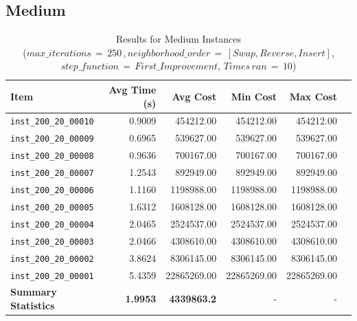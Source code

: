 \documentclass{article}
\begin{document}
\subsection*{Medium}
\begin{table}[H]
 	 \centering 
     \caption{Results for Medium Instances \\($max\_iterations \,{=}\, 250\,, neighborhood\_order \,{=}\, [Swap, Reverse, Insert]$, $step\_function \,{=}\, First\_Improvement$, $Times\, ran \,{=}\, 10$)}
     \hspace*{-1cm}
 	 \begin{tabular}{lrrrrr} 
 	 	\toprule 
 	 	\textbf{Item} & \textbf{Avg Time (s)} & \textbf{Avg Cost} & \textbf{Min Cost} & \textbf{Max Cost} \\ 
 	 	\midrule 
 	 	\texttt{inst\_200\_20\_00010} & 0.9009 & 454212.00 & 454212.00 & 454212.00  \\ \texttt{inst\_200\_20\_00009} & 0.6965 & 539627.00 & 539627.00 & 539627.00 \\ \texttt{inst\_200\_20\_00008} & 0.9636 & 700167.00 & 700167.00 & 700167.00 \\  \texttt{inst\_200\_20\_00007} & 1.2543 & 892949.00 & 892949.00 & 892949.00 \\  \texttt{inst\_200\_20\_00006} & 1.1160 & 1198988.00 & 1198988.00 & 1198988.00 \\  \texttt{inst\_200\_20\_00005} & 1.6312 & 1608128.00 & 1608128.00 & 1608128.00 \\  \texttt{inst\_200\_20\_00004} & 2.0465 & 2524537.00 & 2524537.00 & 2524537.00 \\  \texttt{inst\_200\_20\_00003} & 2.0466 & 4308610.00 & 4308610.00 & 4308610.00 \\  \texttt{inst\_200\_20\_00002} & 3.8624 & 8306145.00 & 8306145.00 & 8306145.00 \\  \texttt{inst\_200\_20\_00001} & 5.4359 & 22865269.00 & 22865269.00 & 22865269.00 \\ 
 	 	\midrule 
 	 	\textbf{Summary Statistics} & \textbf{1.9953} & \textbf{4339863.2} & - & - \\ 
 	 	\bottomrule
 	  \end{tabular}
 	  \label{tab:performance_metrics_medium_vnd}
\end{table}
\end{document}

